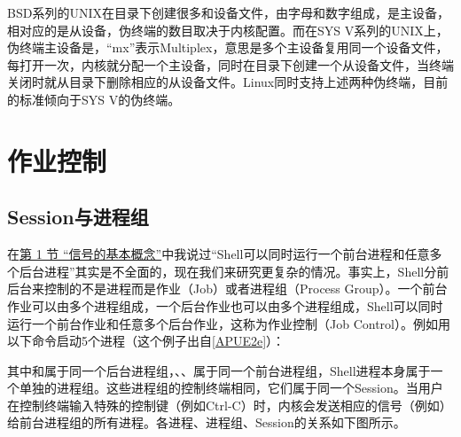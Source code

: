 BSD系列的UNIX在目录下创建很多和设备文件，由字母和数字组成，是主设备，相对应的是从设备，伪终端的数目取决于内核配置。而在SYS V系列的UNIX上，伪终端主设备是，“mx”表示Multiplex，意思是多个主设备复用同一个设备文件，每打开一次，内核就分配一个主设备，同时在目录下创建一个从设备文件，当终端关闭时就从目录下删除相应的从设备文件。Linux同时支持上述两种伪终端，目前的标准倾向于SYS V的伪终端。




\section{作业控制}
%
\subsection{Session与进程组}
%


在\hyperlink{db.ch33s01.id2883230}{第 1 节 “信号的基本概念”}中我说过“Shell可以同时运行一个前台进程和任意多个后台进程”其实是不全面的，现在我们来研究更复杂的情况。事实上，Shell分前后台来控制的不是进程而是作业（Job）或者进程组（Process Group）。一个前台作业可以由多个进程组成，一个后台作业也可以由多个进程组成，Shell可以同时运行一个前台作业和任意多个后台作业，这称为作业控制（Job Control）。例如用以下命令启动5个进程（这个例子出自\hyperlink{db.bi01.bibli.apue}{[APUE2e]}）：




其中和属于同一个后台进程组，、、属于同一个前台进程组，Shell进程本身属于一个单独的进程组。这些进程组的控制终端相同，它们属于同一个Session。当用户在控制终端输入特殊的控制键（例如Ctrl-C）时，内核会发送相应的信号（例如）给前台进程组的所有进程。各进程、进程组、Session的关系如下图所示。


